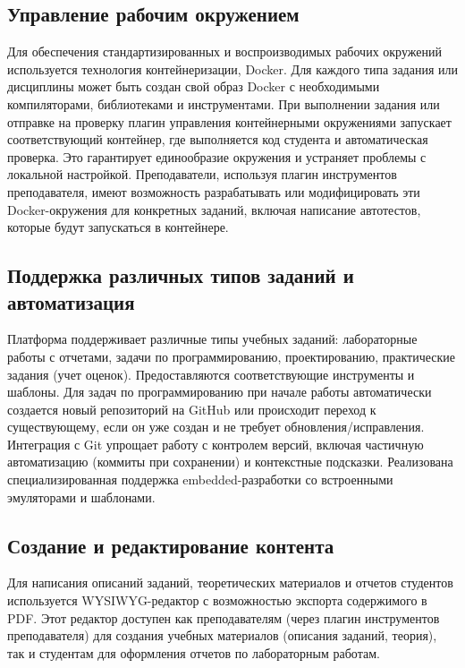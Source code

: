 \documentclass{bsuir}
\begin{document}
\subsection{Управление рабочим окружением}

Для обеспечения стандартизированных и воспроизводимых рабочих окружений используется
технология контейнеризации, Docker. Для каждого типа задания или дисциплины
может быть создан свой образ Docker с необходимыми компиляторами, библиотеками и
инструментами. При выполнении задания или отправке на проверку плагин управления
контейнерными окружениями запускает соответствующий контейнер, где выполняется
код студента и автоматическая проверка. Это гарантирует единообразие окружения и
устраняет проблемы с локальной настройкой. Преподаватели, используя плагин
инструментов преподавателя, имеют возможность разрабатывать или модифицировать
эти Docker-окружения для конкретных заданий, включая написание автотестов,
которые будут запускаться в контейнере.

\subsection{Поддержка различных типов заданий и автоматизация}

Платформа поддерживает различные типы учебных заданий: лабораторные работы с отчетами,
задачи по программированию, проектированию, практические задания (учет оценок).
Предоставляются соответствующие инструменты и шаблоны. Для задач по программированию
при начале работы автоматически создается новый репозиторий на GitHub или происходит
переход к существующему, если он уже создан и не требует обновления/исправления.
Интеграция с Git упрощает работу с контролем версий, включая частичную автоматизацию
(коммиты при сохранении) и контекстные подсказки. Реализована специализированная
поддержка embedded-разработки со встроенными эмуляторами и шаблонами.

\subsection{Создание и редактирование контента}

Для написания описаний заданий, теоретических материалов и отчетов студентов
используется WYSIWYG-редактор с возможностью экспорта содержимого в PDF. Этот редактор
доступен как преподавателям (через плагин инструментов преподавателя) для создания
учебных материалов (описания заданий, теория), так и студентам для оформления
отчетов по лабораторным работам.
\end{document}
